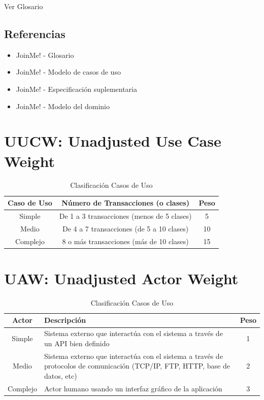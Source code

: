 \documentclass[12pt, a4paper, titlepage]{article}
\begin{document}
Ver Glosario

\subsection{Referencias}

\begin{itemize}

    \item JoinMe! - Glosario
    \item JoinMe! - Modelo de casos de uso
    \item JoinMe! - Especificación suplementaria
    \item JoinMe! - Modelo del dominio
\end{itemize}

\section{UUCW: Unadjusted Use Case Weight}

\begin{table}[h]
	\begin{center}
		\begin{tabular}{|c|c|c|}
	\hline
	Caso de Uso & Número de Transacciones (o clases) & Peso \\ \hline
	Simple & De 1 a 3 transacciones (menos de 5 clases) & 5 \\ \hline
	Medio & De 4 a 7 transacciones (de 5 a 10 clases) & 10 \\ \hline
	Complejo & 8 o más transacciones (más de 10 clases) & 15 \\ \hline
	
	\end{tabular}
	\caption{Clasificación Casos de Uso}
	\end{center}
\end{table}



\section{UAW: Unadjusted Actor Weight}

\begin{table}[h]
	\begin{center}
		\begin{tabular}{|c|p{12cm}|c|}
	\hline
	Actor & Descripción  & Peso \\ \hline
	Simple & Sistema externo que interactúa con el sistema a través de un API bien definido & 1 \\ \hline
	Medio & Sistema externo que interactúa con el sistema a través de protocolos de comunicación (TCP/IP, FTP, HTTP, base de datos, etc)  & 2 \\ \hline
	Complejo & Actor humano usando un interfaz gráfico de la aplicación & 3 \\ \hline
	
	\end{tabular}
	\caption{Clasificación Casos de Uso}
	\end{center}
\end{table}
\end{document}
